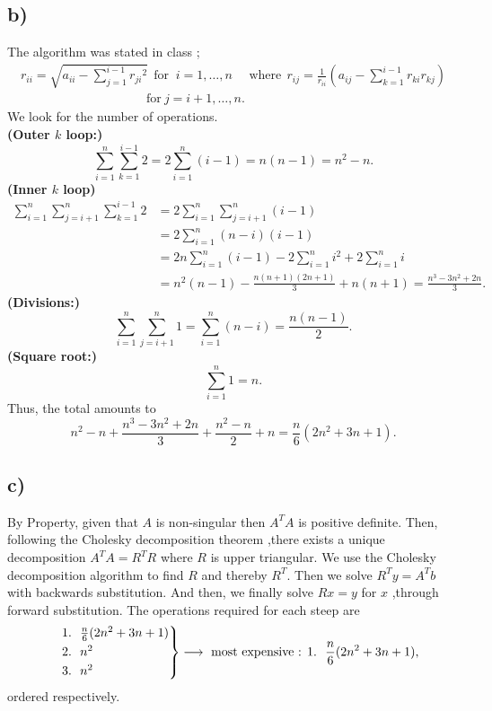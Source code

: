 \documentclass[12pt]{article}
\theoremstyle{definition}
\theoremstyle{definition}
\theoremstyle{definition}
\theoremstyle{definition}
\theoremstyle{definition}
\theoremstyle{example}
\theoremstyle{note}
\theoremstyle{remark}
\theoremstyle{example}
\begin{document}
			\subsection*{b) }
				The algorithm was stated in class ;
				\begin{gather*}
					r_{ii} = \sqrt{a_{ii} - \sum_{j=1}^{i-1} {r_{ji}}^{2}} \ \ \text{for } \ i=1 , \dots ,n \quad \text{ where} \ \ r_{ij} = \frac{1}{r_{ii}} \left(a_{ij} - \sum_{k=1}^{i-1} r_{ki} r_{kj}\right) \\ \qquad\qquad\qquad\qquad\qquad  \text{for} \ j=i+1 , \dots , n.
				\end{gather*}
				We look for the number of operations. \\
				\textbf{(Outer $k$ loop:)} 
				$$ \sum_{i=1}^{n} \sum_{k=1}^{i-1} 2 = 2\sum_{i=1}^{n} (i-1) = n(n-1) = n^{2} -n.$$
				\textbf{(Inner $k$ loop)}
				\begin{align*}
					\sum_{i=1}^{n} \sum_{j=i+1}^{n} \sum_{k=1}^{i-1} 2 &= 2 \sum_{i=1}^{n} \sum_{j=i+1}^{n} (i-1) \\
					&= 2 \sum_{i=1}^{n} (n-i)(i-1) \\
					&= 2n \sum_{i=1}^{n} (i-1) -2 \sum_{i=1}^{n} i^{2} + 2 \sum_{i=1}^{n} i \\
					&= n^{2}(n-1) - \frac{n(n+1)(2n+1)}{3} + n(n+1) = \frac{n^{3} -3n^{2} +2n}{3}.
				\end{align*}
				\textbf{(Divisions:)}
				$$ \sum_{i=1}^{n} \sum_{j=i+1}^{n}1 = \sum_{i=1}^{n} (n-i) = \frac{n(n-1)}{2}.$$
				\textbf{(Square root:)}
				$$\sum_{i=1}^{n} 1 = n.$$
				Thus, the total amounts to 
				$$ n^{2} -n + \frac{n^{3} -3n^{2} +2n}{3} + \frac{n^{2} -n }{2} + n = \frac{n}{6}(2n^{2} + 3n +1).$$
			\subsection*{c) }
				By Property, given that $A$ is non-singular then $A^{T}A$ is positive definite. Then, following the Cholesky decomposition theorem ,there exists a unique decomposition $A^{T}A = R^{T}R$ where $R$ is upper triangular. We use the Cholesky decomposition algorithm to find $R$ and thereby $R^{T}$. Then we solve $R^{T} y =A^{T}b$ with backwards substitution. And then, we finally solve $Rx = y$ for $x$ ,through forward substitution. The operations required for each steep are 
				$$ \begin{rcases}
					&1. \ \ \frac{n}{6}(2n^{2} + 3n +1) \\
					&2. \ \ n^{2} \\
					&3. \ \ n^{2} 
				\end{rcases} \longrightarrow \text{ most expensive : } 1. \ \ \frac{n}{6}(2n^{2} + 3n +1),$$
				ordered respectively.
\end{document}
